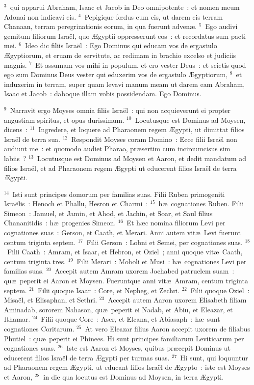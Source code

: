 ${}^{3}$~qui apparui Abraham, Isaac et Jacob in Deo omnipotente~: et nomen meum Adonai non indicavi eis.
${}^{4}$~Pepigique fœdus cum eis, ut darem eis terram Chanaan, terram peregrinationis eorum, in qua fuerunt adven\ae .
${}^{5}$~Ego audivi gemitum filiorum Isra\"el, quo \AE gyptii oppresserunt eos~: et recordatus sum pacti mei.
${}^{6}$~Ideo dic filiis Isra\"el~: Ego Dominus qui educam vos de ergastulo \AE gyptiorum, et eruam de servitute, ac redimam in brachio excelso et judiciis magnis.
${}^{7}$~Et assumam vos mihi in populum, et ero vester Deus~: et scietis quod ego sum Dominus Deus vester qui eduxerim vos de ergastulo \AE gyptiorum,
${}^{8}$~et induxerim in terram, super quam levavi manum meam ut darem eam Abraham, Isaac et Jacob~: daboque illam vobis possidendam. Ego Dominus.


${}^{9}$~Narravit ergo Moyses omnia filiis Isra\"el~: qui non acquieverunt ei propter angustiam spiritus, et opus durissimum.
${}^{10}$~Locutusque est Dominus ad Moysen, dicens~:
${}^{11}$~Ingredere, et loquere ad Pharaonem regem \AE gypti, ut dimittat filios Isra\"el de terra sua.
${}^{12}$~Respondit Moyses coram Domino~: Ecce filii Isra\"el non audiunt me~: et quomodo audiet Pharao, pr\ae sertim cum incircumcisus sim labiis~?
${}^{13}$~Locutusque est Dominus ad Moysen et Aaron, et dedit mandatum ad filios Isra\"el, et ad Pharaonem regem \AE gypti ut educerent filios Isra\"el de terra \AE gypti.


${}^{14}$~Isti sunt principes domorum per familias suas. Filii Ruben primogeniti Isra\"elis~: Henoch et Phallu, Hesron et Charmi~:
${}^{15}$~h\ae\ cognationes Ruben. Filii Simeon~: Jamuel, et Jamin, et Ahod, et Jachin, et Soar, et Saul filius Chananitidis~: h\ae\ progenies Simeon.
${}^{16}$~Et h\ae c nomina filiorum Levi per cognationes suas~: Gerson, et Caath, et Merari. Anni autem vit\ae\ Levi fuerunt centum triginta septem.
${}^{17}$~Filii Gerson~: Lobni et Semei, per cognationes suas.
${}^{18}$~Filii Caath~: Amram, et Isaar, et Hebron, et Oziel~; anni quoque vit\ae\ Caath, centum triginta tres.
${}^{19}$~Filii Merari~: Moholi et Musi~: h\ae\ cognationes Levi per familias suas.
${}^{20}$~Accepit autem Amram uxorem Jochabed patruelem suam~: qu\ae\ peperit ei Aaron et Moysen. Fueruntque anni vit\ae\ Amram, centum triginta septem.
${}^{21}$~Filii quoque Isaar~: Core, et Nepheg, et Zechri.
${}^{22}$~Filii quoque Oziel~: Misa\"el, et Elisaphan, et Sethri.
${}^{23}$~Accepit autem Aaron uxorem Elisabeth filiam Aminadab, sororem Nahason, qu\ae\ peperit ei Nadab, et Abiu, et Eleazar, et Ithamar.
${}^{24}$~Filii quoque Core~: Aser, et Elcana, et Abiasaph~: h\ae\ sunt cognationes Coritarum.
${}^{25}$~At vero Eleazar filius Aaron accepit uxorem de filiabus Phutiel~: qu\ae\ peperit ei Phinees. Hi sunt principes familiarum Leviticarum per cognationes suas.
${}^{26}$~Iste est Aaron et Moyses, quibus pr\ae cepit Dominus ut educerent filios Isra\"el de terra \AE gypti per turmas suas.
${}^{27}$~Hi sunt, qui loquuntur ad Pharaonem regem \AE gypti, ut educant filios Isra\"el de \AE gypto~: iste est Moyses et Aaron,
${}^{28}$~in die qua locutus est Dominus ad Moysen, in terra \AE gypti.


